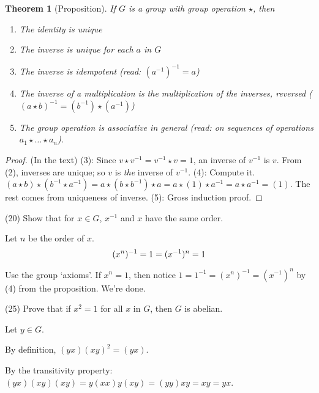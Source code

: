 \documentclass[1    0pt, answers]{exam} \renewcommand{\baselinestretch}{1.05}
\theoremstyle{plain}
\newtheorem{theorem}{Theorem}
\theoremstyle{definition}
\begin{document}
\begin{questions}
\begin{theorem}[Proposition]
If $G$ is a group with group operation $\star$, then
\begin{enumerate}
    \item The identity is unique
    \item The inverse is unique for each $a$ in $G$
    \item The inverse is idempotent (read: $(a^{-1})^{-1} = a$)
    \item The inverse of a multiplication is the multiplication of the inverses, reversed ( $(a \star b)^{-1} = (b^{-1}) \star (a^{-1})$)
    \item The group operation is associative \emph{in general} (read: on sequences of operations $a_1 \star \ldots \star a_n$).
\end{enumerate}
\end{theorem}
\begin{proof} (In the text)
(3): Since $v \star v^{-1} = v^{-1} \star v = 1$, an inverse of $v^{-1}$ is $v$. From (2), inverses are unique; so $v$ is \emph{the} inverse of $v^{-1}$.
(4): Compute it. $(a \star b) \star (b^{-1} \star a^{-1}) = a \star (b \star b^{-1}) \star a = a \star (1) \star a^{-1} = a \star a^{-1} = (1)$. The rest comes from uniqueness of inverse.
(5): Gross induction proof.
\end{proof}



\question (20) Show that for $x \in G$, $x^{-1}$ and $x$ have the same order.
\begin{solution}
Let $n$ be the order of $x$.
\[
(x^n)^{-1}\\
= 1\\
= (x^{-1})^n\\
= 1
\]
\end{solution}

\begin{solution}
Use the group `axioms'.
If $x^n = 1$, then notice $1 = 1^{-1} = (x^n)^{-1} = (x^{-1})^n$ by (4) from the proposition. We're done.
\end{solution}

\question (25) Prove that if $x^2 = 1$ for all $x$ in $G$, then $G$ is abelian.
\begin{solution}
Let $y \in G$.

By definition, $(yx)(xy)^2 = (yx)$.

By the transitivity property: $(yx)(xy)(xy) = y(xx)y(xy) = (yy) xy = xy = yx$.


\end{solution}
\end{questions}
\end{document}
